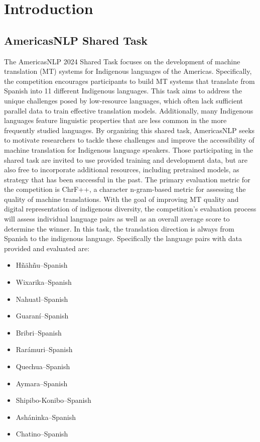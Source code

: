 \chapter{Introduction}
\label{chap:introduction}

\section{AmericasNLP Shared Task}
The AmericasNLP 2024 Shared Task \cite{americasnlp2024} focuses on the development of   machine translation (MT) systems for Indigenous languages of the Americas. Specifically, the competition encourages participants to build MT systems that translate from Spanish into 11 different Indigenous languages. This task aims to address the unique challenges posed by low-resource languages, which often lack sufficient parallel data to train effective translation models. Additionally, many Indigenous languages feature linguistic properties that are less common in the more frequently studied languages. By organizing this shared task, AmericasNLP seeks to motivate researchers to tackle these challenges and improve the accessibility of machine translation for Indigenous language speakers.
Those participating in the shared task are invited to use provided training and development data, but are also free to incorporate additional resources, including pretrained models, as strategy that has been successful in the past. The primary evaluation metric for the competition is ChrF++, a character n-gram-based metric for assessing the quality of machine translations. With the goal of improving MT quality and digital representation of indigenous diversity,  the competition's evaluation process will assess individual language pairs as well as an overall average score to determine the winner. In this task, the translation direction is always from Spanish to the indigenous language. Specifically the language pairs with data provided and evaluated are: 
\begin{itemize}
    \item Hñähñu–Spanish
    \item Wixarika–Spanish
    \item Nahuatl–Spanish
    \item Guaraní–Spanish
    \item Bribri–Spanish
    \item Rarámuri–Spanish
    \item Quechua–Spanish
    \item Aymara–Spanish
    \item Shipibo-Konibo–Spanish
    \item Asháninka–Spanish
    \item Chatino–Spanish    
\end{itemize}


